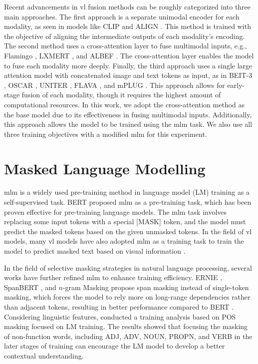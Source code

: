 Recent advancements in \acrshort{vl} fusion methods can be roughly categorized into three main approaches.  
The first approach is a separate unimodal encoder for each modality, as seen in models like CLIP \cite{clip} and ALIGN \cite{align}.  
This method is trained with the objective of aligning the intermediate outputs of each modality's encoding.  
The second method uses a cross-attention layer to fuse multimodal inputs, e.g., Flamingo \cite{flamingo}, LXMERT \cite{lxmert}, and ALBEF \cite{albef}.  
The cross-attention layer enables the model to fuse each modality more deeply.  
Finally, the third approach uses a single large attention model with concatenated image and text tokens as input, as in BEIT-3 \cite{beit-3}, OSCAR \cite{oscar}, UNITER \cite{uniter}, FLAVA \cite{flava}, and mPLUG \cite{mplug}.  
This approach allows for early-stage fusion of each modality, though it requires the highest amount of computational resources.  
In this work, we adopt the cross-attention method as the base model due to its effectiveness in fusing multimodal inputs.  
Additionally, this approach allows the model to be trained using the \acrshort{mlm} task.  
We also use all three training objectives with a modified \acrshort{mlm} for this experiment.  

\section{Masked Language Modelling}
\acrshort{mlm} is a widely used pre-training method in language model (LM) training \cite{bert, albert, dictbert, opt, realm} as a self-supervised task.  
BERT \cite{bert} proposed \acrshort{mlm} as a pre-training task, which has been proven effective for pre-training language models.  
The \acrshort{mlm} task involves replacing some input tokens with a special [MASK] token, and the model must predict the masked tokens based on the given unmasked tokens.  
In the field of \acrshort{vl} models, many \acrshort{vl} models have also adopted \acrshort{mlm} as a training task to train the model to predict masked text based on visual information \cite{albef, mplug, uniter, beit-3}.  

In the field of selective masking strategies in natural language processing, several works have further refined \acrshort{mlm} to enhance training efficiency.  
ERNIE \cite{ERNIE}, SpanBERT \cite{spanBERT}, and \(n\)-gram Masking \cite{n-gram-masking} propose span masking instead of single-token masking, which forces the model to rely more on long-range dependencies rather than adjacent tokens, resulting in better performance compared to BERT \cite{bert}.  
Considering linguistic features,  conducted a training analysis based on POS masking focused on LM training.  
The results showed that focusing the masking of non-function words, including ADJ, ADV, NOUN, PROPN, and VERB in the later stages of training can encourage the LM model to develop a better contextual understanding.  

